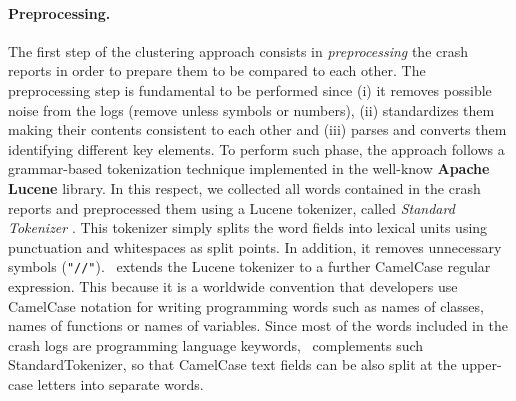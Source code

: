 \paragraph{Preprocessing.}
The first step of the clustering approach consists in \textit{preprocessing} the crash reports in order to prepare them to be compared to each other.
The preprocessing step is fundamental to be performed since (i) it removes possible noise from the logs (remove unless symbols or numbers), (ii) standardizes them making their contents consistent to each other and (iii) parses and converts them identifying different key elements. 
To perform such phase, the approach follows a grammar-based tokenization technique implemented in the well-know \textbf{Apache Lucene} \cite{lucene} library.  
In this respect, we collected all words contained in the crash reports and preprocessed them using a Lucene tokenizer, called \textit{Standard Tokenizer} \cite{lucenestandardanalyser}. 
This tokenizer simply splits the word fields into lexical units using punctuation and whitespaces as split points. In addition, it removes unnecessary symbols (\eg \texttt{"//"}).
\toolname\ extends the Lucene tokenizer to a further CamelCase regular expression.
This because it is a worldwide convention that developers use CamelCase notation for writing programming words such as names of classes, names of functions or names of variables.
Since most of the words included in the crash logs are programming language keywords, \toolname\ complements such StandardTokenizer, so that CamelCase text fields can be also split at the upper-case letters into separate words. 

